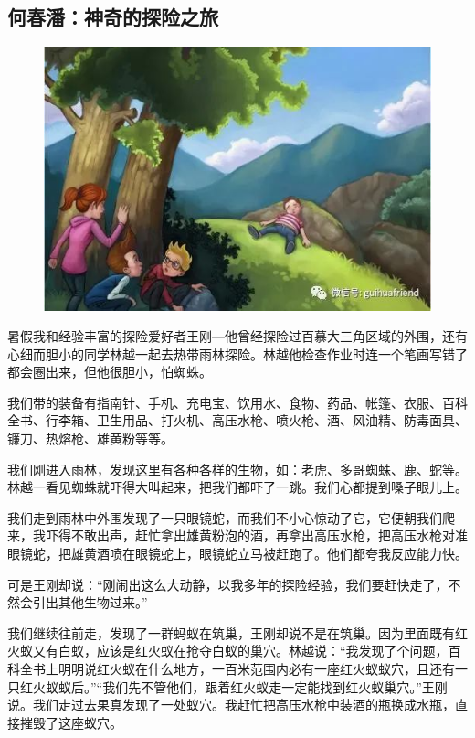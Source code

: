 \vspace{10pt}

{\centering\subsection*{何春潘：神奇的探险之旅}}


\renewcommand{\leftmark}{何春潘：神奇的探险之旅}

\begin{figure}[htbp]

\centering

\includegraphics[width = .5\textwidth]{./ch/8.jpg}

\end{figure}



暑假我和经验丰富的探险爱好者王刚—他曾经探险过百慕大三角区域的外围，还有心细而胆小的同学林越一起去热带雨林探险。林越他检查作业时连一个笔画写错了都会圈出来，但他很胆小，怕蜘蛛。

我们带的装备有指南针、手机、充电宝、饮用水、食物、药品、帐篷、衣服、百科全书、行李箱、卫生用品、打火机、高压水枪、喷火枪、酒、风油精、防毒面具、镰刀、热熔枪、雄黄粉等等。

我们刚进入雨林，发现这里有各种各样的生物，如：老虎、多哥蜘蛛、鹿、蛇等。林越一看见蜘蛛就吓得大叫起来，把我们都吓了一跳。我们心都提到嗓子眼儿上。

我们走到雨林中外围发现了一只眼镜蛇，而我们不小心惊动了它，它便朝我们爬来，我吓得不敢出声，赶忙拿出雄黄粉泡的酒，再拿出高压水枪，把高压水枪对准眼镜蛇，把雄黄酒喷在眼镜蛇上，眼镜蛇立马被赶跑了。他们都夸我反应能力快。

可是王刚却说：“刚闹出这么大动静，以我多年的探险经验，我们要赶快走了，不然会引出其他生物过来。”

我们继续往前走，发现了一群蚂蚁在筑巢，王刚却说不是在筑巢。因为里面既有红火蚁又有白蚁，应该是红火蚁在抢夺白蚁的巢穴。林越说：“我发现了个问题，百科全书上明明说红火蚁在什么地方，一百米范围内必有一座红火蚁蚁穴，且还有一只红火蚁蚁后。”“我们先不管他们，跟着红火蚁走一定能找到红火蚁巢穴。”王刚说。我们走过去果真发现了一处蚁穴。我赶忙把高压水枪中装酒的瓶换成水瓶，直接摧毁了这座蚁穴。

